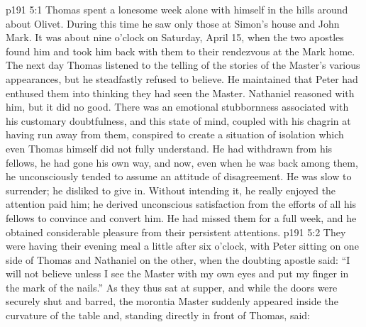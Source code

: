 \vs p191 5:1 Thomas spent a lonesome week alone with himself in the hills around about Olivet. During this time he saw only those at Simon’s house and John Mark. It was about nine o’clock on Saturday, April 15, when the two apostles found him and took him back with them to their rendezvous at the Mark home. The next day Thomas listened to the telling of the stories of the Master’s various appearances, but he steadfastly refused to believe. He maintained that Peter had enthused them into thinking they had seen the Master. Nathaniel reasoned with him, but it did no good. There was an emotional stubbornness associated with his customary doubtfulness, and this state of mind, coupled with his chagrin at having run away from them, conspired to create a situation of isolation which even Thomas himself did not fully understand. He had withdrawn from his fellows, he had gone his own way, and now, even when he was back among them, he unconsciously tended to assume an attitude of disagreement. He was slow to surrender; he disliked to give in. Without intending it, he really enjoyed the attention paid him; he derived unconscious satisfaction from the efforts of all his fellows to convince and convert him. He had missed them for a full week, and he obtained considerable pleasure from their persistent attentions.
\vs p191 5:2 They were having their evening meal a little after six o’clock, with Peter sitting on one side of Thomas and Nathaniel on the other, when the doubting apostle said: “I will not believe unless I see the Master with my own eyes and put my finger in the mark of the nails.” As they thus sat at supper, and while the doors were securely shut and barred, the morontia Master suddenly appeared inside the curvature of the table and, standing directly in front of Thomas, said:
